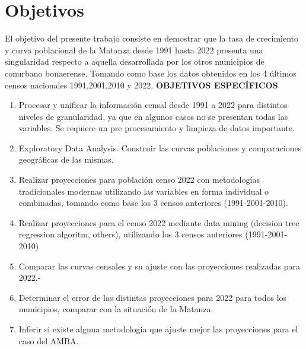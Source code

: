 \documentclass{article}
\theoremstyle{mytheoremstyle}
\theoremstyle{mytheoremstyle}
\theoremstyle{myproblemstyle}
\begin{document}
\section{Objetivos }
El objetivo del presente trabajo consiste en demostrar que la tasa de crecimiento y 
curva poblacional de la Matanza desde 1991 hasta 2022 presenta una singularidad respecto 
a aquella desarrollada por los otros municipios de conurbano bonaerense. 
Tomando como base los datos obtenidos en los 4 últimos censos nacionales 1991,2001,2010 y 2022.  
\smallskip
\textbf{OBJETIVOS ESPECÍFICOS}
\begin{enumerate}
  \item Procesar y unificar la información censal desde 1991 a 2022 para distintos niveles de granularidad, 
  ya que en algunos casos no se presentan todas las variables.  
  Se requiere un pre procesamiento y limpieza de datos importante.
  \item Exploratory Data Analysis. Construir las curvas poblaciones y comparaciones geográficas de las mismas.
  \item Realizar proyecciones para población censo 2022 con metodologías tradicionales modernas utilizando las
   variables en forma individual o combinadas, tomando como base los 3 censos anteriores (1991-2001-2010).
  \item Realizar proyecciones para el censo 2022 mediante data mining (decision tree regression algoritm, others),
   utilizando los 3 censos anteriores (1991-2001-2010)
  \item Comparar las curvas censales y su ajuste con las proyecciones realizadas para 2022.-
  \item Determinar el error de las distintas proyecciones para 2022 para todos los municipios, 
  comparar con la situación de la Matanza.  
  \item Inferir si existe alguna metodología que ajuste mejor las proyecciones para el caso del AMBA.
\end{enumerate}
\end{document}
